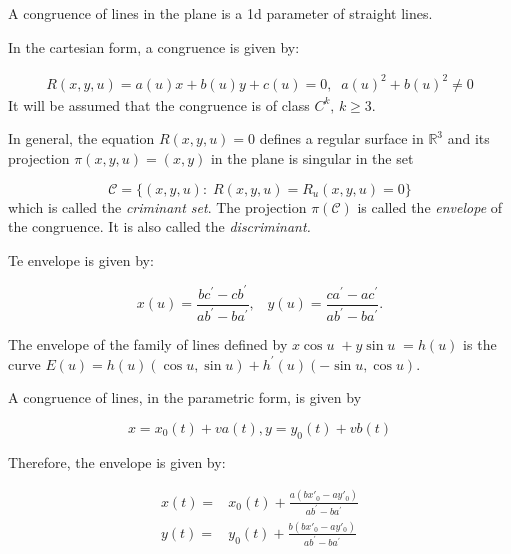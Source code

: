 

\begin{definition}
A congruence of lines in the plane is a 1d parameter of straight lines.
\end{definition}

 
   In the cartesian form, a congruence is given by:
 

\begin{align}  R(x,y,u)=a(u)x+b(u)y+c(u)=0,\;\; a(u)^2+b(u)^2\ne  0
\label{eq:appB-cr}
\end{align}
It will be assumed that the congruence is of class  $C^k,\, k\geq 3$. 

In general, the equation   $R(x,y,u)=0$ defines a regular surface in   $\mathbb{R}^3$  and its projection   $\pi(x,y,u)=(x,y)$ in the plane is singular in the set  

  \[\mathcal{C}= \{(x,y,u): \; R(x,y,u)=  R_u(x,y,u) =0 \} \]
  which is called the   \textit{criminant set}.
  The projection $\pi(\mathcal{C})$ is called the \textit{envelope} of the congruence. It is also called the     \textit{  discriminant.}

Te envelope is given by:

\begin{equation}\label{eq:env}
x(u)=\frac{b c^\prime-c b^\prime}{a b^\prime-b a^\prime},\;\;\; y(u)=\frac{c a^\prime-a c^\prime}{a b^\prime-b a^\prime}.
\end{equation}

 

\begin{example}  The envelope of the family of lines defined by   $x \cos u\;  +y\sin u \;  =h(u)$ is the curve
	$E(u)=h(u)(\cos u,\sin u)	+h^\prime(u)(-\sin u, \cos u). $
\end{example}

 
 A congruence of lines, in the parametric form, is given by
 
 \[ x=x_0(t)+v a(t), y=y_0(t)+v b(t)\]

 Therefore, the envelope is given by:
 
	
 	\begin{align*}
   x(t)=&x_0(t)+\frac{   a( b x'_0-a y'_0)}{a b^\prime-b a^\prime} \\
 	y(t)=&y_0(t)+ \frac{   b( b x'_0-a y'_0)}{a b^\prime-b a^\prime} 	\end{align*}
 
 
 
